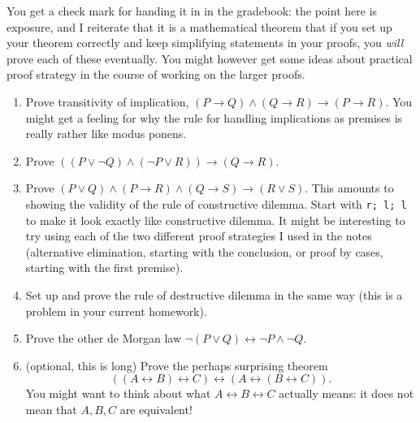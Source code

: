 \documentclass[12pt]{article}
\begin{document}
You get a check mark for handing it in in the gradebook:  the point here is exposure, and I reiterate that it is a mathematical theorem that if you set up your theorem correctly and keep simplifying statements in your proofs, you {\em will\/} prove each of these eventually.  You might however get some ideas about practical proof strategy in the course of working on the larger proofs.

\begin{enumerate}

\item Prove transitivity of implication, $(P \rightarrow Q) \wedge (Q \rightarrow R) \rightarrow (P \rightarrow R)$.  You might get a feeling for why the rule for handling implications as premises is really rather like modus ponens.

\item Prove $((P \vee \neg Q) \wedge (\neg P \vee R)) \rightarrow (Q \rightarrow R)$.

\item Prove $(P \vee Q) \wedge (P \rightarrow R) \wedge (Q \rightarrow S) \rightarrow (R \vee S)$.  This amounts to showing the validity of the rule of constructive dilemma.
Start with {\tt r; l; l} to make it look exactly like constructive dilemma.  It might be interesting to try using each of the two different proof strategies I used in the notes
(alternative elimination, starting with the conclusion, or proof by cases, starting with the first premise).

\item Set up and prove the rule of destructive dilemma in the same way (this is a problem in your current homework).

\item Prove the other de Morgan law  $\neg(P \vee Q) \leftrightarrow \neg P \wedge \neg Q$.

\item (optional, this is long) Prove the perhaps surprising theorem $$((A \leftrightarrow B) \leftrightarrow C) \leftrightarrow (A \leftrightarrow (B \leftrightarrow C)).$$  You might want to think about what
$A \leftrightarrow B \leftrightarrow C$ actually means:  it does not mean that $A,B,C$ are equivalent!



\end{enumerate}
\end{document}

